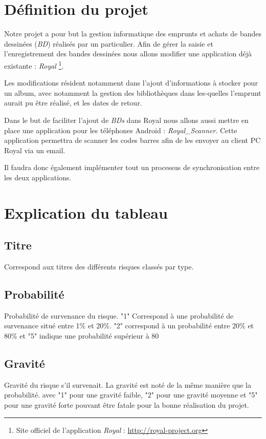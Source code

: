 \documentclass[etudiants]{support-iutrs}
\begin{document}
\header
\section*{Définition du projet}

Notre projet a pour but la gestion informatique des emprunts et achats de bandes dessinées (\emph{BD}) réalisés par un particulier.
Afin de gérer la saisie et l'enregistrement des bandes dessinées nous allons modifier une application déjà existante : \emph{Royal}
\footnote{Site officiel de l'application \emph{Royal} : \url{http://royal-project.org}}.

Les modifications résident notamment dans l'ajout d'informations à stocker pour un album, avec notamment la gestion des bibliothèques dans les-quelles l'emprunt aurait pu être réalisé, et les dates de retour. 

Dans le but de faciliter l'ajout de \emph{BDs} dans Royal nous allons aussi mettre en place une application pour les téléphones Android : \emph{Royal\_Scanner}.
Cette application permettra de scanner les codes barres afin de les envoyer au client PC Royal via un email.

Il faudra donc également implémenter tout un processus de synchronisation entre les deux applications. 

\section*{Explication du tableau}

\subsection{Titre}
Correspond aux titres des différents risques classés par type.

\subsection{Probabilité}
Probabilité de survenance du risque. "1" Correspond à une probabilité de survenance situé entre 1\% et 20\%. "2" correspond à un probabilité entre 20\% et 80\% et "5" indique une probabilité supérieur à 80%

\subsection{Gravité}
Gravité du risque s'il survenait. La gravité est noté de la même manière que la probabilité. avec "1" pour une gravité faible, "2" pour une gravité moyenne et "5" pour une gravité forte pouvant être fatale pour la bonne réalisation du projet.
\end{document}
